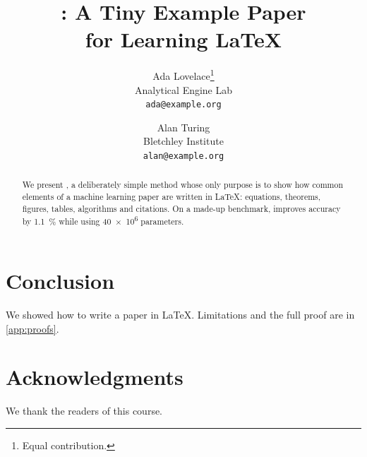 \documentclass[11pt]{article}
\title{\method: A Tiny Example Paper\\for Learning \LaTeX{}}
\author{
  Ada Lovelace\thanks{Equal contribution.} \\
  Analytical Engine Lab\\
  \texttt{ada@example.org}
  \and
  Alan Turing\footnotemark[1] \\
  Bletchley Institute\\
  \texttt{alan@example.org}
}
\date{}
\begin{document}
\maketitle

\begin{abstract}
  We present \method, a deliberately simple method whose only purpose is to
  show how common elements of a machine learning paper are written in \LaTeX{}:
  equations, theorems, figures, tables, algorithms and citations.
  On a made-up benchmark, \method improves accuracy by \qty{1.1}{\percent}
  while using \num{40e6} parameters.
\end{abstract}





\section{Conclusion}\label{sec:conclusion}
We showed how to write a paper in \LaTeX{}. Limitations and the full proof are
in \cref{app:proofs}.

\section*{Acknowledgments}
We thank the readers of this course.




\clearpage
\appendix

\end{document}
